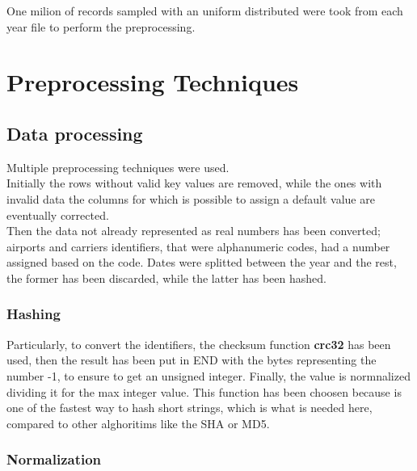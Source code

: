 \documentclass[
	letterpaper, %
	10pt, %
]{class}
\begin{document}
One milion of records sampled with an uniform distributed were took from each year file to perform the preprocessing.


\section{Preprocessing Techniques}

\subsection{Data processing}

Multiple preprocessing techniques were used.\\

Initially the rows without valid key values are removed, while the ones with invalid data the columns for which is possible to assign a default value are eventually corrected.\\

Then the data not already represented as real numbers has been converted; airports and carriers identifiers, that were alphanumeric codes, had a number assigned based on the code. Dates were splitted between the year and the rest, the former has been discarded, while the latter has been hashed.\\

\subsubsection{Hashing}

Particularly, to convert the identifiers, the checksum function \textbf{crc32} \cite{crc32} has been used, then the result has been put in END with the bytes representing the number -1, to ensure to get an unsigned integer. Finally, the value is normnalized dividing it for the max integer value.
This function has been choosen because is one of the fastest way to hash short strings, which is what is needed here, compared to other alghoritims like the SHA or MD5.\\

\subsubsection{Normalization}
\end{document}
